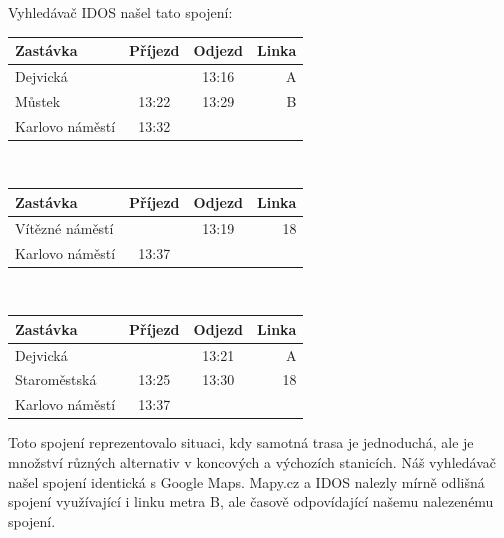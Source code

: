 Vyhledávač IDOS našel tato spojení:\\[2mm]
\begin{tabular}{|l|c|c|r|}\hline
{\bf Zastávka}&{\bf Příjezd}&{\bf Odjezd}&{\bf Linka}\\\hline
Dejvická&&13:16&A\\\hline
Můstek&13:22&13:29&B\\\hline
Karlovo náměstí&13:32&&\\\hline
\end{tabular}\\[2mm]
\begin{tabular}{|l|c|c|r|}\hline
{\bf Zastávka}&{\bf Příjezd}&{\bf Odjezd}&{\bf Linka}\\\hline
Vítězné náměstí&&13:19&18\\\hline
Karlovo náměstí&13:37&&\\\hline
\end{tabular}\\[2mm]
\begin{tabular}{|l|c|c|r|}\hline
{\bf Zastávka}&{\bf Příjezd}&{\bf Odjezd}&{\bf Linka}\\\hline
Dejvická&&13:21&A\\\hline
Staroměstská&13:25&13:30&18\\\hline
Karlovo náměstí&13:37&&\\\hline
\end{tabular} 

Toto spojení reprezentovalo situaci, kdy samotná trasa je jednoduchá, ale je
množství různých alternativ v koncových a výchozích stanicích. Náš vyhledávač
našel spojení identická s Google Maps. Mapy.cz a IDOS nalezly mírně odlišná
spojení využívající i linku metra B, ale časově odpovídající našemu nalezenému
spojení. 

